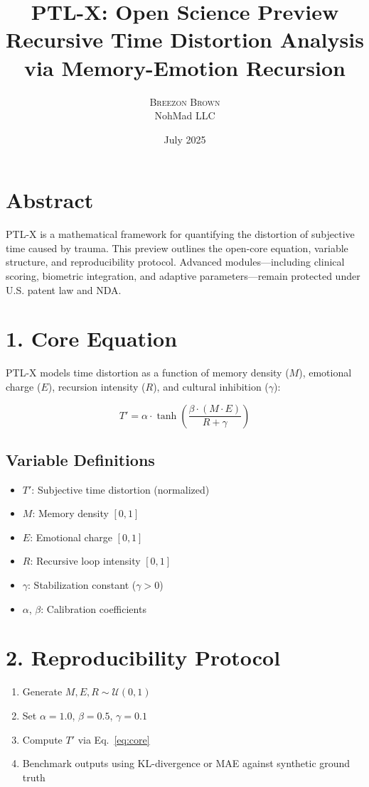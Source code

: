 \documentclass[12pt]{article}
\title{PTL-X: Open Science Preview \\ \large Recursive Time Distortion Analysis via Memory-Emotion Recursion}
\author{\textsc{Breezon Brown} \\ NohMad LLC}
\date{July 2025}
\begin{document}
\maketitle

\section*{Abstract}
PTL-X is a mathematical framework for quantifying the distortion of subjective time caused by trauma. This preview outlines the open-core equation, variable structure, and reproducibility protocol. Advanced modules---including clinical scoring, biometric integration, and adaptive parameters---remain protected under U.S. patent law and NDA.

\section*{1. Core Equation}
PTL-X models time distortion as a function of memory density ($M$), emotional charge ($E$), recursion intensity ($R$), and cultural inhibition ($\gamma$):

\begin{equation}
T' = \alpha \cdot \tanh\left( \frac{\beta \cdot (M \cdot E)}{R + \gamma} \right)
\label{eq:core}
\end{equation}

\subsection*{Variable Definitions}
\begin{itemize}[label=\textbullet,itemsep=0pt]
    \item $T'$: Subjective time distortion (normalized)
    \item $M$: Memory density $[0,1]$
    \item $E$: Emotional charge $[0,1]$
    \item $R$: Recursive loop intensity $[0,1]$
    \item $\gamma$: Stabilization constant ($\gamma > 0$)
    \item $\alpha$, $\beta$: Calibration coefficients
\end{itemize}

\section*{2. Reproducibility Protocol}
\begin{enumerate}[itemsep=0pt]
    \item Generate $M, E, R \sim \mathcal{U}(0,1)$
    \item Set $\alpha=1.0$, $\beta=0.5$, $\gamma=0.1$
    \item Compute $T'$ via Eq.~\ref{eq:core}
    \item Benchmark outputs using KL-divergence or MAE against synthetic ground truth
\end{enumerate}
\end{document}
